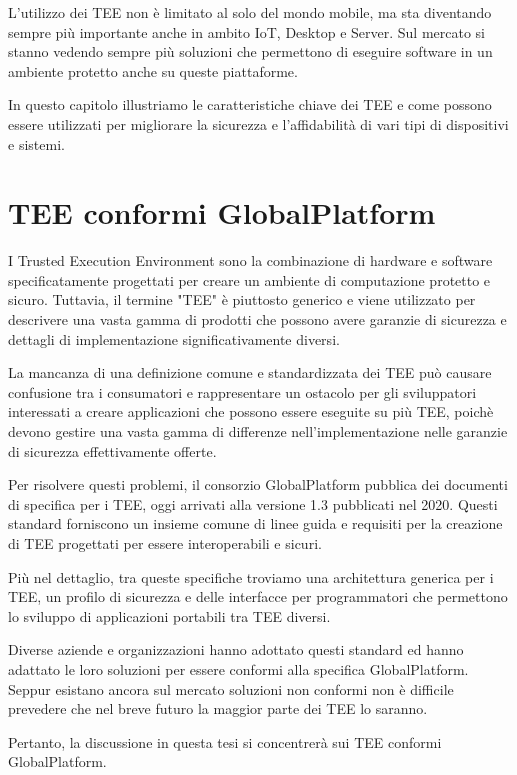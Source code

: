 \documentclass[12pt,italian]{report}
\begin{document}
L'utilizzo dei TEE non è limitato al solo del mondo mobile,
ma sta diventando sempre più importante anche in ambito IoT, Desktop e Server.
Sul mercato si stanno vedendo sempre più soluzioni che permettono di 
eseguire software in un ambiente protetto anche su queste piattaforme.

In questo capitolo illustriamo le caratteristiche chiave dei TEE e come
possono essere utilizzati per migliorare la sicurezza e l'affidabilità di
vari tipi di dispositivi e sistemi.

\section{TEE conformi GlobalPlatform}
\label{sec:tee-conformi-globalplatform}
I Trusted Execution Environment sono la combinazione di hardware e software
specificatamente progettati per creare un ambiente di computazione protetto e sicuro.
Tuttavia, il termine "TEE" è piuttosto generico e viene utilizzato per
descrivere una vasta gamma di prodotti che possono avere garanzie di
sicurezza e dettagli di implementazione significativamente diversi.

La mancanza di una definizione comune e standardizzata dei TEE
può causare confusione tra i consumatori e rappresentare un ostacolo per
gli sviluppatori interessati a creare applicazioni che possono essere
eseguite su più TEE,
poichè devono gestire una vasta gamma di differenze nell'implementazione
nelle garanzie di sicurezza effettivamente offerte.

Per risolvere questi problemi, il consorzio GlobalPlatform pubblica
dei documenti di specifica per i TEE, oggi arrivati alla
versione 1.3 pubblicati nel 2020.
Questi standard forniscono un insieme comune di linee guida e requisiti per
la creazione di TEE progettati per essere interoperabili e sicuri.

Più nel dettaglio, tra queste specifiche troviamo una architettura
generica per i TEE, un profilo di sicurezza e delle interfacce per
programmatori che permettono lo sviluppo di applicazioni portabili tra TEE
diversi. 

Diverse aziende e organizzazioni hanno adottato questi standard
ed hanno adattato le loro soluzioni per essere conformi alla specifica
GlobalPlatform.
Seppur esistano ancora sul mercato soluzioni non conformi non è difficile
prevedere che nel breve futuro la maggior parte dei TEE lo saranno.

Pertanto, la discussione in questa tesi si concentrerà sui
TEE conformi GlobalPlatform.
\end{document}
